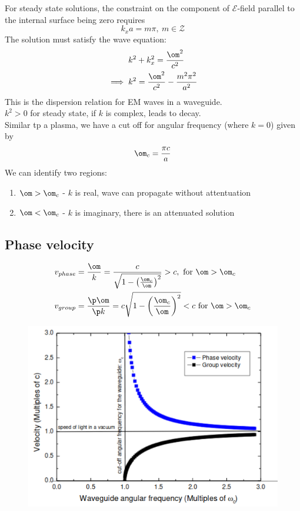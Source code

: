 \documentclass[a4paper, 11pt, normalem]{report}
\renewcommand\E{\mathcal{E}}
\begin{document}
For steady state solutions, the constraint on the component of $\E$-field parallel to the internal surface being zero requires
\begin{equation}
	k_xa = m\pi,~ m \in \mathcal{Z}
\end{equation}
The solution must satisfy the wave equation:
\begin{align}
	k^2 &+ k_x^2 = \frac{\om^2}{c^2} \\
	\implies k^2 &= \frac{\om^2}{c^2} - \frac{m^2\pi^2}{a^2}
\end{align}
This is the dispersion relation for EM waves in a waveguide. \\
$k^2 > 0$ for steady state, if $k$ is complex, leads to decay. \\
Similar tp a plasma, we have a cut off for angular frequency (where $k = 0$) given by
\begin{equation}
	\om_c = \frac{\pi c}{a}
\end{equation}
We can identify two regions:
\begin{enumerate}
	\item $\om > \om_c$ - $k$ is real, wave can propagate without attentuation
	\item $\om < \om_c$ - $k$ is imaginary, there is an attenuated solution
\end{enumerate}

\subsection{Phase velocity}
\begin{align}
	v_{phase} &= \frac{\om}{k} = \frac{c}{\sqrt{1 - \left(\frac{\om_c}{\om}\right)^2}} > c, \text{ for } \om > \om_c \\
	v_{group} &= \frac{\p \om}{\p k} = c\sqrt{1 - \left(\frac{\om_c}{\om}\right)^2} < c \text{ for } \om > \om_c
\end{align}

\begin{figure}[H]
	\centering
	\includegraphics[scale=0.5]{phasegroup2.png}
\end{figure}
\end{document}
